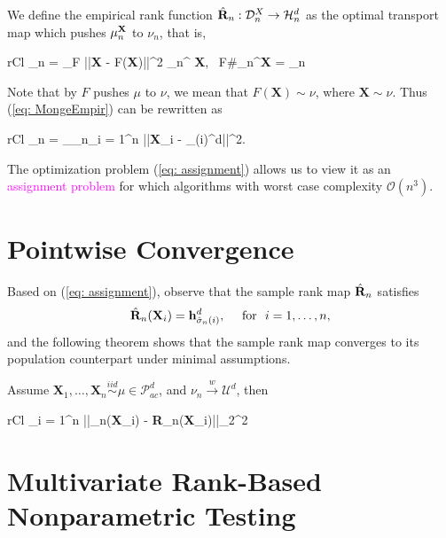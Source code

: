 \begin{definition}
	We define the empirical rank function $\hat{\bf R}_n: \mathcal{D}_n^X \to \mathcal{H}_n^d$ as the optimal transport map which pushes $\mu_n^{\bf X}$ to $\nu_n$, that is, 
	\begin{IEEEeqnarray}{rCl}
		_n = \arg\inf\limits_{F} \int ||{\bf X} - F({\bf X})||^2 {\mu}_n^{ \bf X}, \quad {} \ F\#\mu_n^{\bf X} = \nu_n \label{eq: MongeEmpir}
	\end{IEEEeqnarray}
\end{definition}
\begin{remark}
	Note that by $F$ pushes $\mu$ to $\nu$, we mean that $F(\mathbf{X}) \sim \nu$, where $\mathbf{X} \sim \nu$. Thus (\ref{eq: MongeEmpir}) can be rewritten as 
	\begin{IEEEeqnarray}{rCl}
		\hat{\bf \sigma}_n = \arg\inf\limits_{\sigma \in {}_n}\sum_{i = 1}^n ||{\bf X}_i - _{\sigma(i)}^d||^2. \label{eq: assignment}
	\end{IEEEeqnarray}
The optimization problem (\ref{eq: assignment}) allows us to view it as an \textcolor{magenta}{assignment problem} for which algorithms with worst case complexity $\mathcal{O}(n^3)$.
\end{remark}


\section{Pointwise Convergence}
Based on (\ref{eq: assignment}), observe that the sample rank map $\hat{\bf R}_n$ satisfies
\[
\hat{\bf R}_n({\bf X}_i) = \mathbf{h}^d_{\hat{\sigma}_n(i)},  \quad \ \text{for } \ i = 1, \dots, n,
\]
and the following theorem shows that the sample rank map converges to its population counterpart under minimal assumptions. 
\begin{theorem}
	Assume $\mathbf{X}_1, \dots, \mathbf{X}_n \stackrel{iid}\sim \mu \in \mathcal{P}_{ac}^d$, and $\nu_n \stackrel{w}\to \mathcal{U}^d$, then
	\begin{IEEEeqnarray}{rCl}
		\sum_{i = 1}^n ||_n({\bf X}_i) - {\bf R}_n({\bf X}_i)||_{2}^2  \nonumber
	\end{IEEEeqnarray}
\end{theorem}
\begin{remark}
	
\end{remark}

\section{Multivariate Rank-Based Nonparametric Testing}
